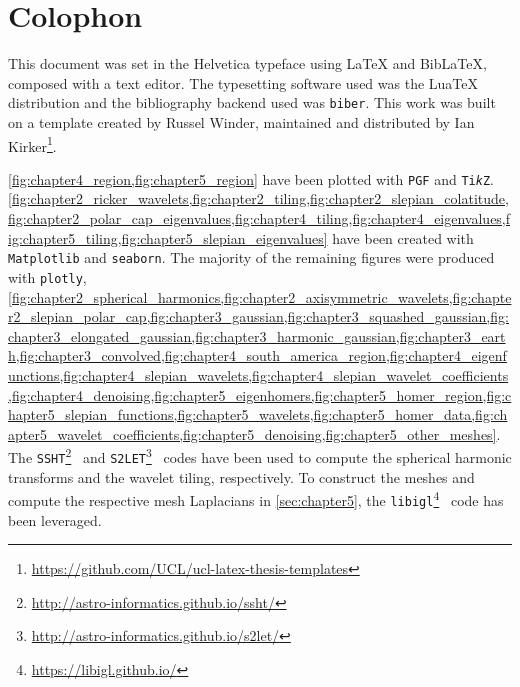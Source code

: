 \appendix

\chapter{Colophon}\label{sec:appendix}

This document was set in the Helvetica typeface using \LaTeX{} and Bib\LaTeX{}, composed with a text editor.
The typesetting software used was the Lua\TeX{} distribution and the bibliography backend used was \texttt{biber}.
This work was built on a template created by Russel Winder, maintained and distributed by Ian Kirker\footnote{\url{https://github.com/UCL/ucl-latex-thesis-templates}}.

\cref{fig:chapter4_region,fig:chapter5_region} have been plotted with \texttt{PGF} and \texttt{Ti\emph{k}Z}.
\cref{fig:chapter2_ricker_wavelets,fig:chapter2_tiling,fig:chapter2_slepian_colatitude,fig:chapter2_polar_cap_eigenvalues,fig:chapter4_tiling,fig:chapter4_eigenvalues,fig:chapter5_tiling,fig:chapter5_slepian_eigenvalues} have been created with \texttt{Matplotlib} and \texttt{seaborn}.
The majority of the remaining figures were produced with \texttt{plotly}, \ie{} \cref{fig:chapter2_spherical_harmonics,fig:chapter2_axisymmetric_wavelets,fig:chapter2_slepian_polar_cap,fig:chapter3_gaussian,fig:chapter3_squashed_gaussian,fig:chapter3_elongated_gaussian,fig:chapter3_harmonic_gaussian,fig:chapter3_earth,fig:chapter3_convolved,fig:chapter4_south_america_region,fig:chapter4_eigenfunctions,fig:chapter4_slepian_wavelets,fig:chapter4_slepian_wavelet_coefficients,fig:chapter4_denoising,fig:chapter5_eigenhomers,fig:chapter5_homer_region,fig:chapter5_slepian_functions,fig:chapter5_wavelets,fig:chapter5_homer_data,fig:chapter5_wavelet_coefficients,fig:chapter5_denoising,fig:chapter5_other_meshes}.
The \texttt{SSHT}\footnote{\url{http://astro-informatics.github.io/ssht/}}~\cite{McEwen2011} and \texttt{S2LET}\footnote{\url{http://astro-informatics.github.io/s2let/}}~\cite{Leistedt2013} codes have been used to compute the spherical harmonic transforms and the wavelet tiling, respectively.
To construct the meshes and compute the respective mesh Laplacians in \cref{sec:chapter5}, the \texttt{libigl}\footnote{\url{https://libigl.github.io/}}~\cite{Libigl2017} code has been leveraged.


